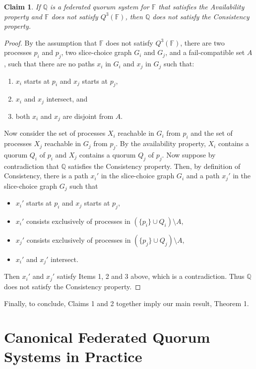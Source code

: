 \documentclass[11pt]{article}
\newtheorem{claim}{Claim}
\begin{document}
\begin{claim}
  If $\mathbb{Q}$ is a federated quorum system for $\mathbb{F}$ that satisfies the Availability property and $\mathbb{F}$ does not satisfy $Q^3(\mathbb{F})$, then $\mathbb{Q}$ does not satisfy the Consistency property.
\end{claim}
\begin{proof}
  By the assumption that $\mathbb{F}$ does not satisfy $Q^3(\mathbb{F})$, there are two processes $p_i$ and $p_j$, two slice-choice graph $G_i$ and $G_j$, and a fail-compatible set $A$, such that there are no paths $x_i$ in $G_i$ and $x_j$ in $G_j$ such that:
  \begin{enumerate}
    \item $x_i$ starts at $p_i$ and $x_j$ starts at $p_j$,
    \item $x_i$ and $x_j$ intersect, and
    \item both $x_i$ and $x_j$ are disjoint from $A$.
  \end{enumerate}
  Now consider the set of processes $X_i$ reachable in $G_i$ from $p_i$ and the set of processes $X_j$ reachable in $G_j$ from $p_j$. By the availability property, $X_i$ contains a quorum $Q_i$ of $p_i$ and $X_j$ contains a quorum $Q_j$ of $p_j$.
  Now suppose by contradiction that $\mathbb{Q}$ satisfies the Consistency property.
  Then, by definition of Consistency, there is a path $x_i'$ in the slice-choice graph $G_i$ and a path $x_j'$ in the slice-choice graph $G_j$ such that
  \begin{itemize}
    \item $x_i'$ starts at $p_i$ and $x_j$ starts at $p_j$,
    \item $x_i'$ consists exclusively of processes in $\left(\{p_i\} \cup Q_i\right)\setminus A$,
    \item $x_j'$ consists exclusively of processes in $\left(\{p_j\} \cup Q_j\right)\setminus A$,
    \item $x_i'$ and $x_j'$ intersect.
  \end{itemize}
  Then $x_i'$ and $x_j'$ satisfy Items 1, 2 and 3 above, which is a contradiction. Thus $\mathbb{Q}$ does not satisfy the Consistency property.
\end{proof}

Finally, to conclude, Claims 1 and 2 together imply our main result, Theorem 1.

\section{Canonical Federated Quorum Systems in Practice}
\label{sec:practice}
\end{document}
